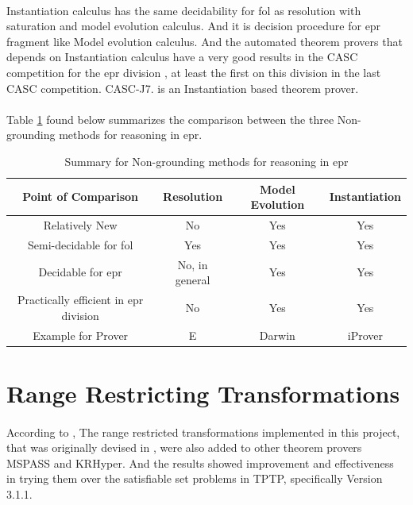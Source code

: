 \paragraph{}
Instantiation calculus has the same decidability for \ac{fol} as resolution with saturation and model evolution calculus. And it is decision procedure for \ac{epr} fragment like Model evolution calculus. And the automated theorem provers that depends on Instantiation calculus have a very good results in the CASC competition for the \ac{epr} division \cite{CASC_24,CASC_J7}, at least the first on this division in the last CASC competition. CASC-J7. is an Instantiation based theorem prover.

\paragraph{}
Table \ref{table:cal_comp} found below summarizes the comparison between the three Non-grounding methods for reasoning in \ac{epr}.

	\begin{table}[H]
		\centering
		\begin{tabular}{||c | c | c | c||} 
 			\hline
			Point of Comparison & Resolution & Model Evolution & Instantiation \\ %
 			\hline\hline
			Relatively New & No & Yes & Yes \\
			Semi-decidable for \ac{fol} & Yes & Yes & Yes \\
			Decidable for \ac{epr} & No, in general & Yes & Yes \\
			Practically efficient in \ac{epr} division & No & Yes & Yes \\ 
			Example for Prover	& E	& Darwin		& iProver \\ [1ex] 
 			\hline
		\end{tabular}
		\caption{Summary for Non-grounding methods for reasoning in \ac{epr}}
		\label{table:cal_comp}
	\end{table}



\section{Range Restricting Transformations}
\paragraph{}
According to \cite{BMUG06}, The range restricted transformations implemented in this project, that was originally devised in \cite{BMUG06}, were also added to other theorem provers MSPASS and KRHyper. And the results showed improvement and effectiveness in trying them over the satisfiable set problems in TPTP, specifically Version 3.1.1.   
